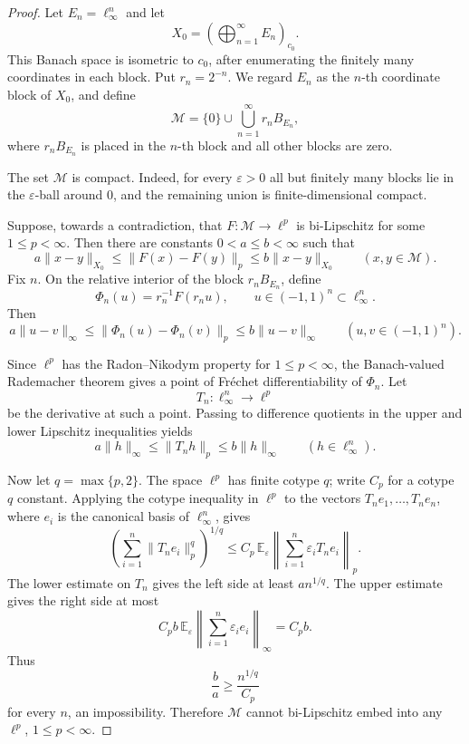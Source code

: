 \documentclass[11pt]{article}
\newcommand{\M}{\mathcal M}
\begin{document}
\begin{proof}
Let \(E_n=\ell_\infty^n\) and let
\[
  X_0=\left(\bigoplus_{n=1}^{\infty}E_n\right)_{c_0}.
\]
This Banach space is isometric to \(c_0\), after enumerating the finitely many
coordinates in each block. Put \(r_n=2^{-n}\). We regard \(E_n\) as the
\(n\)-th coordinate block of \(X_0\), and define
\[
  \M=\{0\}\cup \bigcup_{n=1}^{\infty} r_n B_{E_n},
\]
where \(r_n B_{E_n}\) is placed in the \(n\)-th block and all other blocks are
zero.

The set \(\M\) is compact. Indeed, for every \(\varepsilon>0\) all but
finitely many blocks lie in the \(\varepsilon\)-ball around \(0\), and the
remaining union is finite-dimensional compact.

Suppose, towards a contradiction, that \(F:\M\to\ell^p\) is bi-Lipschitz for
some \(1\leq p<\infty\). Then there are constants \(0<a\leq b<\infty\) such
that
\[
  a\|x-y\|_{X_0}\leq \|F(x)-F(y)\|_p\leq b\|x-y\|_{X_0}
  \qquad (x,y\in\M).
\]
Fix \(n\). On the relative interior of the block \(r_n B_{E_n}\), define
\[
  \Phi_n(u)=r_n^{-1}F(r_n u),\qquad u\in (-1,1)^n\subset \ell_\infty^n.
\]
Then
\[
  a\|u-v\|_\infty\leq \|\Phi_n(u)-\Phi_n(v)\|_p
  \leq b\|u-v\|_\infty
  \qquad (u,v\in (-1,1)^n).
\]

Since \(\ell^p\) has the Radon--Nikodym property for \(1\leq p<\infty\),
the Banach-valued Rademacher theorem gives a point of Fréchet
differentiability of \(\Phi_n\). Let
\[
  T_n:\ell_\infty^n\to\ell^p
\]
be the derivative at such a point. Passing to difference quotients in the
upper and lower Lipschitz inequalities yields
\[
  a\|h\|_\infty\leq \|T_n h\|_p\leq b\|h\|_\infty
  \qquad (h\in\ell_\infty^n).
\]

Now let \(q=\max\{p,2\}\). The space \(\ell^p\) has finite cotype \(q\);
write \(C_p\) for a cotype \(q\) constant. Applying the cotype inequality in
\(\ell^p\) to the vectors \(T_n e_1,\dots,T_n e_n\), where \(e_i\) is the
canonical basis of \(\ell_\infty^n\), gives
\[
  \left(\sum_{i=1}^n \|T_n e_i\|_p^q\right)^{1/q}
  \leq
  C_p\,\mathbb E_\varepsilon
  \left\|\sum_{i=1}^n \varepsilon_i T_n e_i\right\|_p .
\]
The lower estimate on \(T_n\) gives the left side at least \(a n^{1/q}\).
The upper estimate gives the right side at most
\[
  C_p b\,\mathbb E_\varepsilon
  \left\|\sum_{i=1}^n \varepsilon_i e_i\right\|_\infty
  = C_p b.
\]
Thus
\[
  \frac{b}{a}\geq \frac{n^{1/q}}{C_p}
\]
for every \(n\), an impossibility. Therefore \(\M\) cannot bi-Lipschitz embed
into any \(\ell^p\), \(1\leq p<\infty\).
\end{proof}
\end{document}
